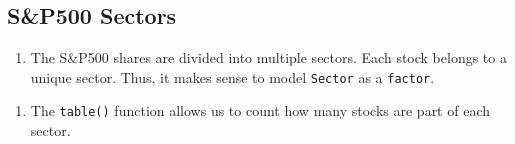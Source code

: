 \documentclass[
  letterpaper,
  DIV=11,
  numbers=noendperiod]{scrreport}
\newenvironment{Shaded}{\begin{snugshade}}{\end{snugshade}}
\newcommand{\CommentTok}[1]{\textcolor[rgb]{0.37,0.37,0.37}{#1}}
\newcommand{\ControlFlowTok}[1]{\textcolor[rgb]{0.00,0.23,0.31}{#1}}
\newcommand{\FunctionTok}[1]{\textcolor[rgb]{0.28,0.35,0.67}{#1}}
\newcommand{\NormalTok}[1]{\textcolor[rgb]{0.00,0.23,0.31}{#1}}
\newcommand{\OtherTok}[1]{\textcolor[rgb]{0.00,0.23,0.31}{#1}}
\newcommand{\SpecialCharTok}[1]{\textcolor[rgb]{0.37,0.37,0.37}{#1}}
\newcommand{\StringTok}[1]{\textcolor[rgb]{0.13,0.47,0.30}{#1}}
\providecommand{\tightlist}{%
  \setlength{\itemsep}{0pt}\setlength{\parskip}{0pt}}\usepackage{longtable,booktabs,array}
\begin{document}
\begin{Shaded}
\end{Shaded}

\hypertarget{sp500-sectors}{%
\subsection{S\&P500 Sectors}\label{sp500-sectors}}

\begin{enumerate}
\def\labelenumi{\arabic{enumi}.}
\tightlist
\item
  The S\&P500 shares are divided into multiple sectors. Each stock
  belongs to a unique sector. Thus, it makes sense to model
  \texttt{Sector} as a \texttt{factor}.
\end{enumerate}

\begin{Shaded}
\end{Shaded}

\begin{enumerate}
\def\labelenumi{\arabic{enumi}.}
\setcounter{enumi}{1}
\tightlist
\item
  The \texttt{table()} function allows us to count how many stocks are
  part of each sector.
\end{enumerate}
\end{document}
